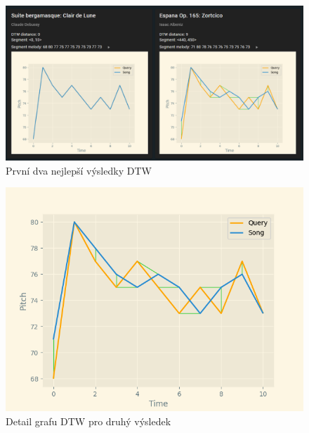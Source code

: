 \pagebreak

\begin{figure}[!ht]
    \centering
    \caption{První dva nejlepší výsledky DTW}
    \includegraphics[width=\textwidth]{images/dtw_results.png}
\end{figure}

\begin{figure}[!ht]
    \centering
    \caption{Detail grafu DTW pro druhý výsledek}
    \includegraphics[width=\textwidth]{images/dtw_graph_example.png}
\end{figure}

\pagebreak
